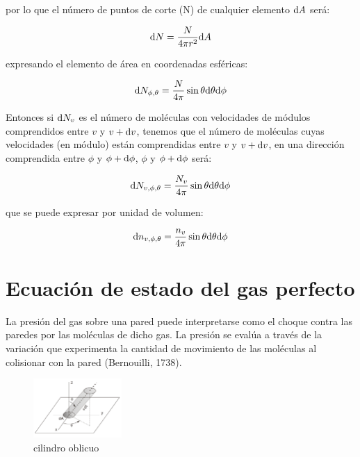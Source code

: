 \documentclass[12pt,a4paper,oneside]{book}
\begin{document}
por lo que el número de puntos de corte (N) de cualquier elemento $\mathrm{d} A$ será:

\begin{equation}
\mathrm{d} N = \dfrac{N}{4 \pi r^2} \mathrm{d} A
\end{equation}

expresando el elemento de área en coordenadas esféricas:

\begin{equation}
\mathrm{d} N_{\phi, \theta} = \dfrac{N}{4 \pi} \sin \theta \mathrm{d} \theta \mathrm{d} \phi
\end{equation}

Entonces si $\mathrm{d} N_v$ es el número de moléculas con velocidades de módulos comprendidos entre $v$ y $v + \mathrm{d} v$, tenemos que el número de moléculas cuyas velocidades (en módulo) están comprendidas entre $v$ y $v + \mathrm{d} v$, en una dirección comprendida entre $\phi$ y $\phi + \mathrm{d} \phi$, $\phi$ y $\phi +\mathrm{d} \phi$ será:


\begin{equation}
\mathrm{d} N_{v,\phi, \theta} = \dfrac{N_v}{4 \pi} \sin \theta \mathrm{d} \theta \mathrm{d} \phi
\end{equation}

que se puede expresar por unidad de volumen:

\begin{equation}
\mathrm{d} n_{v,\phi, \theta} = \dfrac{n_v}{4 \pi} \sin \theta \mathrm{d} \theta \mathrm{d} \phi
\end{equation}

\section{Ecuación de estado del gas perfecto}

La presión del gas sobre una pared puede interpretarse como el choque contra las paredes por las moléculas de dicho gas. La presión se evalúa a través de la variación que experimenta la cantidad de movimiento de las moléculas al colisionar con la pared (Bernouilli, 1738). \\


\begin{figure}
    \centering
    \includegraphics[width=0.30\textwidth]{cilindrooblicuo.png}
    \caption{cilindro oblicuo}
    \label{Fig:6.2-cilindro}
\end{figure}
\end{document}
